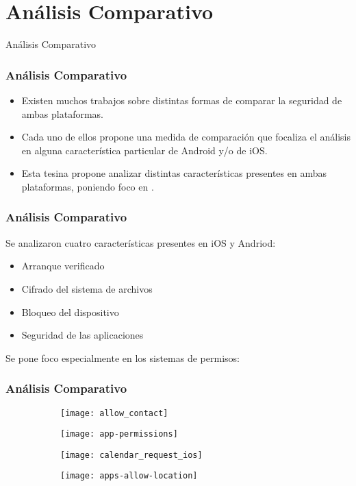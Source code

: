\section{Análisis Comparativo}
\begin{frame}
 \begin{center}
  \LARGE Análisis Comparativo
 \end{center}
\end{frame}
\begin{frame}
 \frametitle{Análisis Comparativo}
 \begin{itemize}[<+->]
  \item Existen muchos trabajos sobre distintas formas de comparar la seguridad de ambas plataformas.
  \item Cada uno de ellos propone una medida de comparación que focaliza el análisis en alguna característica particular de Android y/o de iOS.
  \item Esta tesina propone analizar distintas características presentes en ambas plataformas, \pause poniendo foco en .
 \end{itemize}
\end{frame}
\begin{frame}
 \frametitle{Análisis Comparativo}
 Se analizaron cuatro características presentes en iOS y Andriod:\pause
 \begin{itemize}[<+->]
  \item Arranque verificado
  \item Cifrado del sistema de archivos
  \item Bloqueo del dispositivo
  \item Seguridad de las aplicaciones
 \end{itemize}
 \vspace*{1.5cm}
 \pause Se pone foco especialmente en los sistemas de permisos:
\end{frame}
\begin{frame}
 \frametitle{Análisis Comparativo}
 \begin{figure}[btp]
    \centering
    \begin{subfigure}{0.23\linewidth}
        \texttt{[image: allow\_contact]}
    \end{subfigure}
    \begin{subfigure}{0.23\linewidth}
        \texttt{[image: app-permissions]}
	\end{subfigure}\pause
	\begin{subfigure}{.23\linewidth}
    	\texttt{[image: calendar\_request\_ios]}
    \end{subfigure}
    \begin{subfigure}{.23\linewidth}
    	\texttt{[image: apps-allow-location]}
	\end{subfigure}
\end{figure}
\end{frame}
